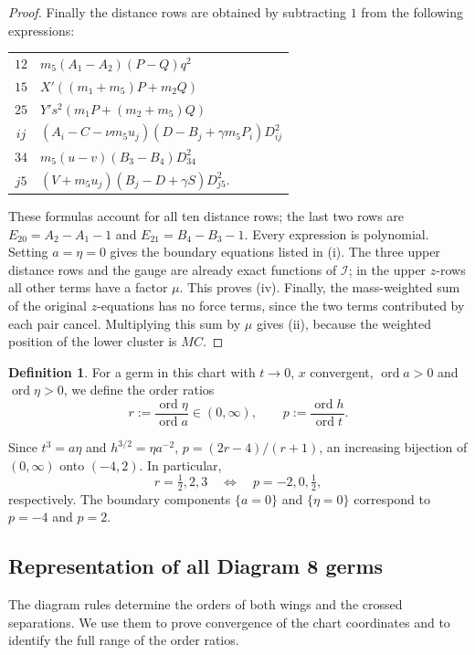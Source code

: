 \documentclass[Threeside,11pt]{article}
\theoremstyle{definition}
\newtheorem{definition}[theorem]{Definition}
\theoremstyle{remark}
\numberwithin{equation}{section}
\theoremstyle{remark}
\newcommand{\ord}{\operatorname{ord}}
\begin{document}
{\begin{proof}
Finally the distance rows are obtained by subtracting $1$ from the
following expressions:
\begin{center}
\begin{tabular}{c l}
$12$ & $m_5(A_1-A_2)(P-Q)q^2$\\
$15$ & $X'((m_1+m_5)P+m_2Q)$\\
$25$ & $Y's^2(m_1P+(m_2+m_5)Q)$\\
$ij$ & $(A_i-C-\nu m_5u_j)(D-B_j+\gamma m_5P_i)D_{ij}^2$\\
$34$ & $m_5(u-v)(B_3-B_4)D_{34}^2$\\
$j5$ & $(V+m_5u_j)(B_j-D+\gamma S)D_{j5}^2$.
\end{tabular}
\end{center}
These formulas account for all ten distance rows; the last two rows are
$E_{20}=A_2-A_1-1$ and $E_{21}=B_4-B_3-1$.
Every expression is polynomial.  Setting $a=\eta=0$ gives the boundary
equations listed in (i).
The three upper distance rows and the gauge are already exact functions
of $\mathcal I$; in the upper $z$-rows all other terms have a factor $\mu$.
This proves (iv).  Finally, the mass-weighted sum of the original $z$-equations
has no force terms, since the two terms contributed by each pair cancel.
Multiplying this sum by $\mu$ gives (ii), because the weighted position of
the lower cluster is $MC$.
\end{proof}

}\begin{definition}\label{def:d8-ray}
For a germ in this chart with $t\to0$, $x$ convergent, $\ord a>0$ and
$\ord\eta>0$, we define the order ratios
\[
 r:=\frac{\ord\eta}{\ord a}\in(0,\infty),\qquad
 p:=\frac{\ord h}{\ord t}.
\]
\end{definition}
Since $t^3=a\eta$ and $h^{3/2}=\eta a^{-2}$, $p=(2r-4)/(r+1)$, an increasing bijection of
$(0,\infty)$ onto $(-4,2)$.  In particular,
\[
r=\tfrac12,2,3\quad\Longleftrightarrow\quad
p=-2,0,\tfrac12,
\]
respectively.  The boundary components $\{a=0\}$ and $\{\eta=0\}$
correspond to $p=-4$ and $p=2$.

\subsection{Representation of all Diagram 8 germs}
The diagram rules determine the orders of both wings and the crossed
separations.  We use them to prove convergence of the chart coordinates and
to identify the full range of the order ratios.
\end{document}
